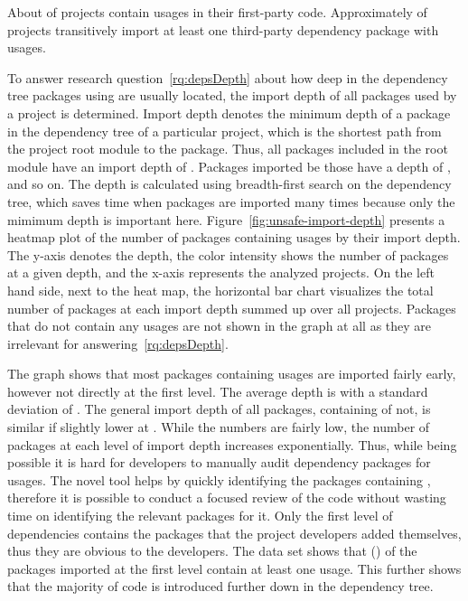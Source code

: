 \begin{tcolorbox}[boxsep=3pt, enlarge top by=5pt, title=Answer to~\ref{rq:prevalApp}]
    About \percentageUnsafeProjectsRounded{} of projects contain \unsafe{} usages in their first-party code.
    Approximately \percentageUnsafeTransitiveWithDependenciesRounded{} of projects transitively import at least one
    third-party dependency package with \unsafe{} usages.
\end{tcolorbox}

To answer research question~\ref{rq:depsDepth} about how deep in the dependency tree packages using \unsafe{} are
usually located, the import depth of all packages used by a project is determined.
Import depth denotes the minimum depth of a package in the dependency tree of a particular project, which is the
shortest path from the project root module to the package.
Thus, all packages included in the root module have an import depth of .
Packages imported be those have a depth of , and so on.
The depth is calculated using breadth-first search on the dependency tree, which saves time when packages are imported
many times because only the mimimum depth is important here.
Figure~\ref{fig:unsafe-import-depth} presents a heatmap plot of the number of packages containing \unsafe{} usages by
their import depth.
The y-axis denotes the depth, the color intensity shows the number of \unsafe{} packages at a given depth, and the
x-axis represents the \projsAnalyzed{} analyzed projects.
On the left hand side, next to the heat map, the horizontal bar chart visualizes the total number of packages at each
import depth summed up over all projects.
Packages that do not contain any \unsafe{} usages are not shown in the graph at all as they are irrelevant for
answering~\ref{rq:depsDepth}.



The graph shows that most packages containing \unsafe{} usages are imported fairly early, however not directly at the
first level.
The average depth is \averageUnsafeImportDepth{} with a standard deviation of \stdUnsafeImportDepth{}.
The general import depth of all packages, containing \unsafe{} of not, is similar if slightly lower at
\averageGeneralImportDepth{}.
While the numbers are fairly low, the number of packages at each level of import depth increases exponentially.
Thus, while being possible it is hard for developers to manually audit dependency packages for \unsafe{} usages.
The novel \toolGeiger{} tool helps by quickly identifying the packages containing \unsafe{}, therefore it is possible to
conduct a focused review of the \unsafe{} code without wasting time on identifying the relevant packages for it.
Only the first level of dependencies contains the packages that the project developers added themselves, thus they are
obvious to the developers.
The data set shows that \levelOneImportedUnsafePackagesCount{} (\levelOneImportedUnsafePackagesShare{}) of the
\levelOneOmportedPackagesCount{} packages imported at the first level contain at least one \unsafe{} usage.
This further shows that the majority of \unsafe{} code is introduced further down in the dependency tree.

